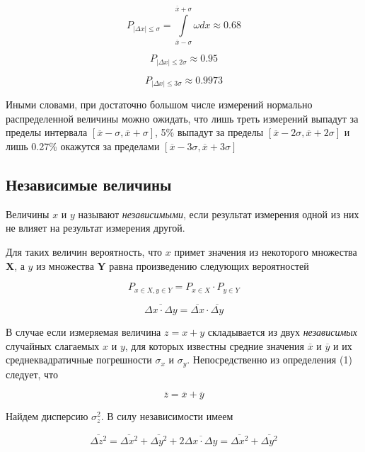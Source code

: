 \documentclass[12pt]{article}
\begin{document}
      $$
        P_{|\Delta x| \leqslant \sigma} = \int \limits_{\overline{x} - \sigma}^{\overline{x} + \sigma}
        \omega dx \approx 0.68
      $$

      $$
        P_{|\Delta x| \leqslant 2 \sigma} \approx 0.95
      $$

      $$
        P_{|\Delta x| \leqslant 3 \sigma} \approx 0.9973
      $$

      Иными словами, при достаточно большом числе измерений нормально распределенной
      величины можно ожидать, что лишь треть измерений выпадут за пределы
      интервала $[\overline{x} - \sigma, \overline{x} + \sigma]$, 5\% выпадут за пределы
      $[\overline{x} - 2 \sigma, \overline{x} + 2 \sigma]$ и лишь 0.27\% окажутся
      за пределами $[\overline{x} - 3 \sigma, \overline{x} + 3 \sigma]$

    \subsection{Независимые величины}

      Величины $x$ и $y$ называют \textit{независимыми}, если результат измерения
      одной из них не влияет на результат измерения другой.

      Для таких величин вероятность, что $x$ примет значения из некоторого множества
      \textbf{X}, а $y$ из множества \textbf{Y} равна произведению следующих вероятностей

      $$
        P_{x \in X, y \in Y} = P_{x \in X} \cdot P_{y \in Y}
      $$

      \begin{equation}
        \overline{\Delta x \cdot \Delta y} = \overline{\Delta x} \cdot \overline{\Delta y}
      \end{equation}

      В случае если измеряемая величина $z = x + y$ складывается из двух
      \textit{независимых} случайных слагаемых $x$ и $y$, для которых известны
      средние значения $\overline{x}$ и $\overline{y}$ и их среднеквадратичные
      погрешности $\sigma_x$ и $\sigma_y$. Непосредственно из определения (1)
      следует, что

      $$
        \overline{z} = \overline{x} + \overline{y}
      $$

      Найдем дисперсию $\sigma_z^2$. В силу независимости имеем

      $$
        \overline{\Delta z^2} = \overline{\Delta x^2} + \overline{\Delta y^2} +
        2 \overline{\Delta x \cdot \Delta y} = \overline{\Delta x^2} + \overline{\Delta y^2}
      $$
\end{document}
